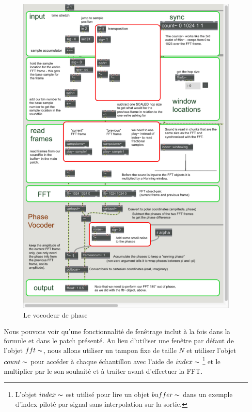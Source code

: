     \begin{figure}
        \centering
        \includegraphics[width = \textwidth]{Graphs/PhaseVocoder.png}
        \caption{Le vocodeur de phase}
        \label{Phasevocoder}
    \end{figure}
    
Nous pouvons voir qu'une fonctionnalité de fenêtrage inclut à la fois dans la formule et dans le patch présenté. Au lieu d'utiliser une fenêtre par défaut de l'objet $ fft \thicksim $, nous allons utiliser un tampon fixe de taille $ N $ et utiliser l'objet $ count \thicksim $ pour accéder à chaque échantillon avec l'aide de $ index \thicksim $ \footnote {L'objet $ index \thicksim $ est utilisé pour lire un objet $ buffer \thicksim $ dans un exemple d'index piloté par signal sans interpolation sur la sortie.} et le multiplier par le son souhaité et à traiter avant d'effectuer la FFT.


